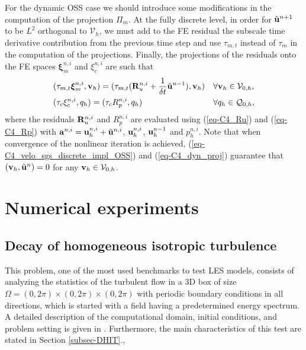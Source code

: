 For the dynamic OSS case we should introduce some modifications in the computation of the projection $\Pi_m$. At the fully discrete level, in order for $\tilde{{\bf u}}^{n+1}$ to be $L^2$ orthogonal to $\mathcal{V}_{h}$, we must add to the FE residual the subscale time derivative contribution from the previous time step and use $\tau_{m,t}$ instead of $\tau_m$ in the computation of the projections. Finally, the projections of the residuals onto the FE spaces $\boldsymbol{\xi}_m^{n,i}$ and $\xi_c^{n,i}$ are such that
\begin{align}
\label{eq-C4_dyn_proj}
&(\tau_{m,t}\boldsymbol{\xi}_m^{n,i},{\bf v}_h)=(\tau_{m,t}({\bf R}_u^{n,i}+\frac{1}{\delta t} \tilde{\mathbf{u}}^{n-1}),{\bf v}_h)&&\forall{\bf v}_h\in\mathcal{V}_{0,h},\\
&(\tau_c\xi_c^{n,i},q_h)=(\tau_c R_p^{n,i},q_h)&&\forall q_h\in\mathcal{Q}_{0,h},
\end{align}
where the residuals ${\bf R}_u^{n,i}$ and $R_p^{n,i}$ are evaluated using (\ref{eq-C4_Ru}) and (\ref{eq-C4_Rp}) with ${\bf a}^{n,i}={\bf u}_h^{n,i}+\tilde{{\bf u}}^{n,i}$, ${\bf u}_h^{n,i}$, ${\bf u}_h^{n-1}$ and $p_h^{n,i}$. %
 Note that when convergence of the nonlinear iteration is achieved, (\ref{eq-C4_velo_sgs_discrete_impl_OSS}) and (\ref{eq-C4_dyn_proj}) guarantee that $({\bf v}_h,\tilde{\mathbf{u}}^{n}) = 0$ for any ${\bf v}_h\in\mathcal{V}_{0,h}$.

\section{Numerical experiments}
\subsection{Decay of homogeneous isotropic turbulence}
\label{subsec-C4_DHIT}
This problem, one of the most used benchmarks to test LES models, consists of analyzing the statistics of the turbulent flow in a 3D box of size $\Omega=(0,2\pi)\times(0,2\pi)\times(0,2\pi)$ with periodic boundary conditions in all directions, which is started with a field having a predetermined energy spectrum. A detailed description of the computational domain, initial conditions, and problem setting is given in \cite{mansour_decay_1994}. Furthermore, the main characteristics of this test are stated in Section \ref{subsec-DHIT}.,

